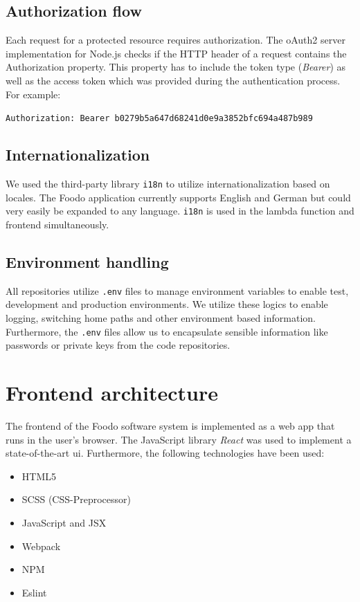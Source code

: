 \subsection*{Authorization flow}
Each request for a protected resource requires authorization. The oAuth2 server implementation for Node.js checks if the HTTP header of a request contains the Authorization property. This property has to include the token type (\textit{Bearer}) as well as the access token which was provided during the authentication process. For example: \vspace{-1.5em}
\begin{center}
	\texttt{Authorization: Bearer b0279b5a647d68241d0e9a3852bfc694a487b989}
\end{center}

\subsection*{Internationalization}
We used the third-party library \texttt{i18n} to utilize internationalization based on locales. The Foodo application currently supports English and German but could very easily be expanded to any language. \texttt{i18n} is used in the lambda function and frontend simultaneously. 

\subsection*{Environment handling}
All repositories utilize \texttt{.env} files to manage environment variables to enable test, development and production environments. We utilize these logics to enable logging, switching home paths and other environment based information. Furthermore, the \texttt{.env} files allow us to encapsulate sensible information like passwords or private keys from the code repositories.

\section{Frontend architecture}

The frontend of the Foodo software system is implemented as a web app that runs in the user’s browser. The JavaScript library \textit{React} was used to implement a state-of-the-art \gls{ui}. Furthermore, the following technologies have been used:

\begin{itemize}
		\itemsep-0.5em
	\item HTML5
	\item SCSS (CSS-Preprocessor)
	\item JavaScript and JSX
	\item Webpack 
	\item NPM
	\item Eslint
\end{itemize}

